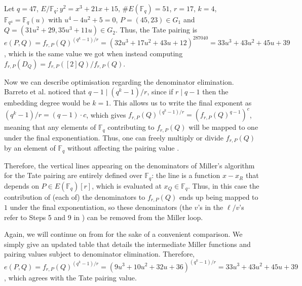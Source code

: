 \begin{example}
 Let $q = 47$, $E/\mathbb{F}_q : y^2 = x^3 + 21x + 15$, $\#E(\mathbb{F}_q) = 51$, $r = 17$, $k = 4$, $\mathbb{F}_{q^4} = \mathbb{F}_q(u)$ with $u^4 - 4u^2 + 5 = 0$, $P = (45, 23) \in G_1$ and $Q = (31u^2 + 29, 35u^3 + 11u) \in G_2$. Thus, the Tate pairing is $e(P, Q) = f_{r,P}(Q)^{(q^k-1)/r} = (32u^3 + 17u^2 + 43u + 12)^{287040} = 33u^3 + 43u^2 + 45u + 39$, which is the same value we got when instead computing $f_{r,P}(D_Q) = f_{r,P}([2]Q)/f_{r,P}(Q)$.

	
\label{example:denominatorelimination}
\end{example}


Now we can describe optimisation regarding the denominator elimination. Barreto et al. \cite{BKLS02} noticed that $q - 1 \mid (q^k - 1)/r$, since if $r \mid q - 1$ then the embedding degree would be $k = 1$. This allows us to write the final exponent as $(q^k - 1)/r = (q-1) \cdot c$, which gives $f_{r,P}(Q)^{(q^k-1)/r} = (f_{r,P}(Q)^{q-1})^c$, meaning that any elements of $\mathbb{F}_q$ contributing to $f_{r,P}(Q)$ will be mapped to one under the final exponentiation. Thus, one can freely multiply or divide $f_{r,P}(Q)$ by an element of $\mathbb{F}_q$ without affecting the pairing value \cite[Corr.\ 1]{BKLS02}.

Therefore, the vertical lines appearing on the denominators of Miller's algorithm for the Tate pairing are entirely defined over $\mathbb{F}_q$: the line is a function $x - x_R$ that depends on $P \in E(\mathbb{F}_q)[r]$, which is evaluated at $x_Q \in \mathbb{F}_q$. Thus, in this case the contribution of (each of) the denominators to $f_{r,P}(Q)$ ends up being mapped to $1$ under the final exponentiation, so these denominators (the $v$'s in the $\ell/v$'s refer to Steps 5 and 9 in ) can be removed from the Miller loop.

\begin{example}
	Again, we will continue on from  for the sake of a convenient comparison. We simply give an updated table that details the intermediate Miller functions and pairing values subject to denominator elimination. Therefore, $e(P, Q) = f_{r,P}(Q)^{(q^k-1)/r} = (9u^3 + 10u^2 + 32u + 36)^{(q^k-1)/r} = 33u^3 + 43u^2 + 45u + 39$, which agrees with the Tate pairing value.
	\label{example:denomelimtate}
\end{example}


